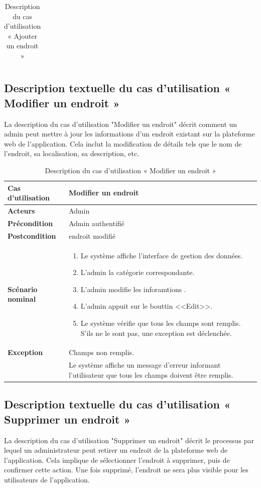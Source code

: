 \begin{sloppypar}
\begin{table}[h]
\begin{tabular}{|p{3cm}|p{12cm}|}
\end{tabular}
\caption{Description du cas d’utilisation « Ajouter un endroit »}
\end{table}

\subsection{Description textuelle du cas d’utilisation « Modifier un endroit »}
\vspace{-3mm}
La description du cas d'utilisation "Modifier un endroit" décrit comment un admin peut mettre à jour les informations d'un endroit existant sur la plateforme web de l'application. Cela inclut la modification de détails tels que le nom de l'endroit, sa localisation, sa description, etc.
\begin{table}[h]
\centering
\begin{tabular}{|p{3cm}|p{12cm}|}
\hline
\textbf{Cas d'utilisation } & Modifier un endroit  \\
\hline
\textbf{Acteurs} & Admin \\
\hline
\textbf{Précondition} & Admin authentifié \\
\hline
\textbf{Postcondition} & endroit  modifié \\
\hline
\textbf{Scénario nominal} &
\begin{enumerate}
    \item Le système affiche l’interface de gestion des données.
    \item L’admin la catégorie correspondante.
    \item L'admin modifie les inforamtions  .
    \item L'admin appuit sur le bouttin <<Edit>>.
    \item Le système vérifie que tous les champs sont remplis. S'ils ne le sont pas, une exception est déclenchée.
    \end{enumerate} \\
\hline
\textbf{Exception } & Champs non remplis. \\
& Le système affiche un message d’erreur informant l’utilisateur que tous les champs doivent être remplis.  \\
\hline

\end{tabular}
\caption{Description du cas d’utilisation « Modifier un endroit »}
\end{table}
\vspace{-1cm}
\subsection{Description textuelle du cas d’utilisation « Supprimer un endroit »}
\vspace{-4mm}
La description du cas d'utilisation "Supprimer un endroit" décrit le processus par lequel un administrateur peut retirer un endroit de la plateforme web de l'application. Cela implique de sélectionner l'endroit à supprimer, puis de confirmer cette action. Une fois supprimé, l'endroit ne sera plus visible pour les utilisateurs de l'application.



\end{sloppypar}
